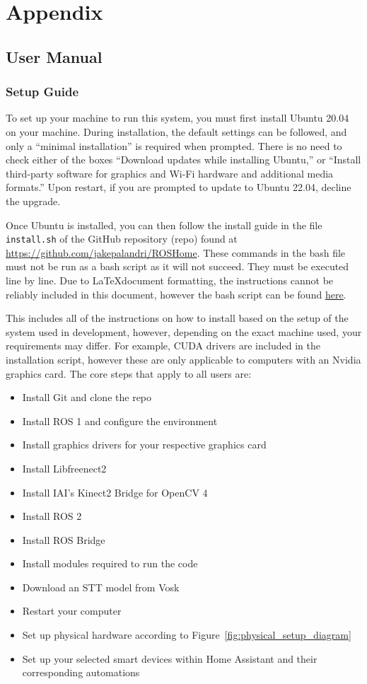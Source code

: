 \chapter{Appendix}\label{ch:appendix}

\section{User Manual}
\subsection{Setup Guide}
To set up your machine to run this system, you must first install Ubuntu 20.04 on your machine.
During installation, the default settings can be followed, and only a ``minimal installation'' is required when prompted.
There is no need to check either of the boxes ``Download updates while installing Ubuntu,'' or ``Install third-party software for graphics and Wi-Fi hardware and additional media formats.''
Upon restart, if you are prompted to update to Ubuntu 22.04, decline the upgrade.

Once Ubuntu is installed, you can then follow the install guide in the file \texttt{install.sh} of the GitHub repository (repo) found at \url{https://github.com/jakepalandri/ROSHome}.
These commands in the bash file must not be run as a bash script as it will not succeed.
They must be executed line by line.
Due to \LaTeX document formatting, the instructions cannot be reliably included in this document, however the bash script can be found \href{https://github.com/jakepalandri/ROSHome/blob/master/install.sh}{\underline{here}}.

This includes all of the instructions on how to install based on the setup of the system used in development, however, depending on the exact machine used, your requirements may differ.
For example, CUDA drivers are included in the installation script, however these are only applicable to computers with an Nvidia graphics card.
The core steps that apply to all users are:

\begin{itemize}
    \item Install Git and clone the repo
    \item Install ROS 1 and configure the environment
    \item Install graphics drivers for your respective graphics card
    \item Install Libfreenect2
    \item Install IAI's Kinect2 Bridge for OpenCV 4
    \item Install ROS 2
    \item Install ROS Bridge
    \item Install modules required to run the code
    \item Download an STT model from Vosk
    \item Restart your computer
    \item Set up physical hardware according to Figure~\ref{fig:physical_setup_diagram}
    \item Set up your selected smart devices within Home Assistant and their corresponding automations 
\end{itemize}

